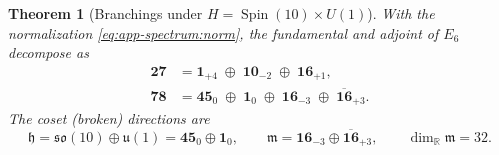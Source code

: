 \documentclass[11pt]{article}
\theoremstyle{plain}
\newtheorem{theorem}{Theorem}[section]
\theoremstyle{definition}
\theoremstyle{remark}
\newcommand{\Spin}{\operatorname{Spin}}
\begin{document}
\begin{theorem}[Branchings under $H=\Spin(10)\times U(1)$]
\label{thm:app-spectrum:branchings}
With the normalization \eqref{eq:app-spectrum:norm}, the fundamental and
adjoint of $E_6$ decompose as
\begin{align}
  \mathbf{27}
    &= \mathbf{1}_{+4}\;\oplus\;\mathbf{10}_{-2}\;\oplus\;\mathbf{16}_{+1},
    \label{eq:app-spectrum:27}\\[2pt]
  \mathbf{78}
    &= \mathbf{45}_{0}\;\oplus\;\mathbf{1}_{0}\;\oplus\;
       \mathbf{16}_{-3}\;\oplus\;\overline{\mathbf{16}}_{+3}.
    \label{eq:app-spectrum:78}
\end{align}
The coset (broken) directions are
\begin{equation}
  \mathfrak h = \mathfrak{so}(10)\oplus\mathfrak u(1)
     = \mathbf{45}_{0}\oplus\mathbf{1}_{0},
  \qquad
  \mathfrak m = \mathbf{16}_{-3}\oplus\overline{\mathbf{16}}_{+3},
  \qquad \dim_{\mathbb R}\mathfrak m = 32 .
  \label{eq:app-spectrum:hm}
\end{equation}
\end{theorem}
\end{document}

